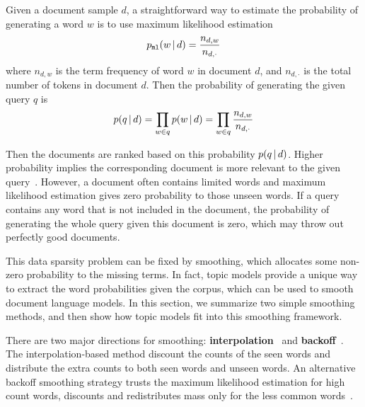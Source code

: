 Given a document sample $d$, a straightforward way to estimate the
probability of generating a word $w$ is to use maximum likelihood
estimation
\begin{align}
p_{\texttt{ml}}(w \, | \, d) = \frac{n_{d,w}}{n_{d,\cdot}}
\label{eq:ir_mse}
\end{align}
where $n_{d,w}$ is the term frequency of word $w$ in document $d$, and
$n_{d,\cdot}$ is the total number of tokens in document $d$. Then the
probability of generating the given query $q$ is
\begin{align}
p(q \, | \, d) = \prod_{w \in q} p(w \, | \, d) = \prod_{w \in q} \frac{n_{d,w}}{n_{d,\cdot}}
\end{align}

Then the documents are ranked based on this probability $p(q \, | \, d)$. Higher
probability implies the corresponding document is more relevant to the
given query~\citep{song-99}. However, a document often contains limited words and
maximum likelihood estimation gives zero probability to those unseen words.
If a query contains any word that is not included in the document, the probability
of generating the whole query given this document is zero, which may throw out perfectly good documents.

This data sparsity problem can be fixed by smoothing, which allocates
some non-zero probability to the missing terms. In fact, topic models
provide a unique way to extract the word probabilities given the
corpus, which can be used to smooth document language models.  In
this section, we summarize two simple smoothing methods, and then
show how topic models fit into this smoothing framework.



There are two major directions for smoothing:
\textbf{interpolation}~\citep{Jelinek-1980,mackay95dirichlet,Ney-1994,PonteCroft,zhai-01}
and \textbf{backoff}~\citep{katz-87,song-99}. The interpolation-based
method discount the counts of the seen words and distribute the extra
counts to both seen words and unseen words. An alternative backoff
smoothing strategy trusts the maximum likelihood estimation for high
count words, discounts and redistributes mass only for the less common
words~\citep{zhai-01}.

